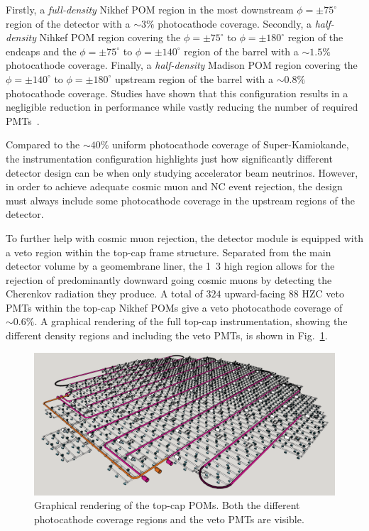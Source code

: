 Firstly, a \emph{full-density} Nikhef POM region in the most downstream $\phi=\pm75^{\circ}$
region of the detector with a $\sim3\%$ photocathode coverage. Secondly, a \emph{half-density}
Nihkef POM region covering the $\phi=\pm75^{\circ}$ to $\phi=\pm180^{\circ}$ region of the endcaps
and the $\phi=\pm75^{\circ}$ to $\phi=\pm140^{\circ}$ region of the barrel with a $\sim1.5\%$
photocathode coverage. Finally, a \emph{half-density} Madison POM region covering the
$\phi=\pm140^{\circ}$ to $\phi=\pm180^{\circ}$ upstream region of the barrel with a $\sim0.8\%$
photocathode coverage. Studies have shown that this configuration results in a negligible
reduction in performance while vastly reducing the number of required PMTs~\cite{blake2016}.

Compared to the $\sim40\%$ uniform photocathode coverage of Super-Kamiokande, the \chipsfive
instrumentation configuration highlights just how significantly different detector design can be
when only studying accelerator beam neutrinos. However, in order to achieve adequate cosmic muon
and NC event rejection, the design must always include some photocathode coverage in the upstream
regions of the detector.

To further help with cosmic muon rejection, the \chipsfive detector module is equipped with a veto
region within the top-cap frame structure. Separated from the main detector volume by a
geomembrane liner, the \unit{1.3}{} high region allows for the rejection of
predominantly downward going cosmic muons by detecting the Cherenkov radiation they produce. A
total of $324$ upward-facing \unit{88}{} HZC veto PMTs within the top-cap Nikhef POMs
give a veto photocathode coverage of $\sim0.6\%$. A graphical rendering of the full top-cap
instrumentation, showing the different density regions and including the veto PMTs, is shown in
Fig.~\ref{fig:top_cap}.

\begin{figure} %
    \includegraphics[width=\textwidth]{diagrams/4-chips/top_cap.png}
    \caption[Graphical rendering of the top-cap Planar Optical Modules]
    {Graphical rendering of the top-cap POMs. Both the different photocathode coverage regions and
        the veto PMTs are visible.}
    \label{fig:top_cap}
\end{figure}

